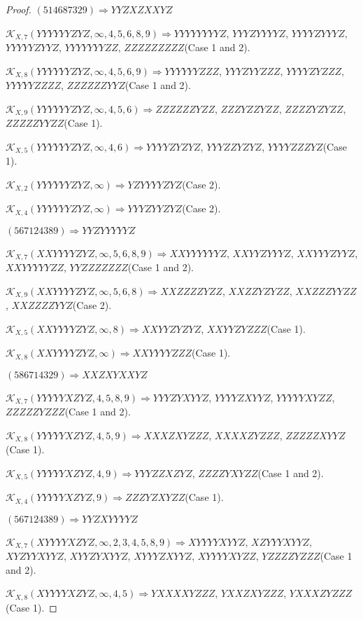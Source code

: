 \documentclass[12pt]{article}
\theoremstyle{plain}
\theoremstyle{definition}
\theoremstyle{remark}
\newcommand{\fancy}[1]{\mathcal{#1}}
\def\K{\fancy{K}}
\begin{document}
\begin{proof}
	$(5 1 4 6 8 7 3 2 9)\Rightarrow YYZXZXXYZ$
	
	
	$\K_{X,7}(YYYYYYZYZ,\infty,4, 5, 6, 8, 9)\Rightarrow $$YYYYYYYYZ$, $YYYZYYYYZ$, $YYYYZYYYZ$, $YYYYYZYYZ$, $YYYYYYYZZ$, $ZZZZZZZZZ$(Case 1 and 2).
	
	$\K_{X,8}(YYYYYYZYZ,\infty,4, 5, 6, 9)\Rightarrow $$YYYYYYZZZ$, $YYYZYYZZZ$, $YYYYZYZZZ$, $YYYYYZZZZ$, $ZZZZZZYYZ$(Case 1 and 2).
	
	$\K_{X,9}(YYYYYYZYZ,\infty,4, 5, 6)\Rightarrow $$ZZZZZZYZZ$, $ZZZYZZYZZ$, $ZZZZYZYZZ$, $ZZZZZYYZZ$(Case 1).
	
	$\K_{X,5}(YYYYYYZYZ,\infty,4, 6)\Rightarrow $$YYYYZYZYZ$, $YYYZZYZYZ$, $YYYYZZZYZ$(Case 1).
	
	$\K_{X,2}(YYYYYYZYZ,\infty)\Rightarrow $$YZYYYYZYZ$(Case 2).
	
	$\K_{X,4}(YYYYYYZYZ,\infty)\Rightarrow $$YYYZYYZYZ$(Case 2).
	
	
	
	$(5 6 7 1 2 4 3 8 9)\Rightarrow YYZYYYYYZ$
	
	
	$\K_{X,7}(XXYYYYZYZ,\infty,5, 6, 8, 9)\Rightarrow $$XXYYYYYYZ$, $XXYYZYYYZ$, $XXYYYZYYZ$, $XXYYYYYZZ$, $YYZZZZZZZ$(Case 1 and 2).
	
	$\K_{X,9}(XXYYYYZYZ,\infty,5, 6, 8)\Rightarrow $$XXZZZZYZZ$, $XXZZYZYZZ$, $XXZZZYYZZ$, $XXZZZZYYZ$(Case 2).
	
	$\K_{X,5}(XXYYYYZYZ,\infty,8)\Rightarrow $$XXYYZYZYZ$, $XXYYZYZZZ$(Case 1).
	
	$\K_{X,8}(XXYYYYZYZ,\infty)\Rightarrow $$XXYYYYZZZ$(Case 1).
	
	
	
	$(5 8 6 7 1 4 3 2 9)\Rightarrow XXZXYXXYZ$
	
	
	$\K_{X,7}(YYYYYXZYZ,4, 5, 8, 9)\Rightarrow $$YYYZYXYYZ$, $YYYYZXYYZ$, $YYYYYXYZZ$, $ZZZZZYZZZ$(Case 1 and 2).
	
	$\K_{X,8}(YYYYYXZYZ,4, 5, 9)\Rightarrow $$XXXZXYZZZ$, $XXXXZYZZZ$, $ZZZZZXYYZ$(Case 1).
	
	$\K_{X,5}(YYYYYXZYZ,4, 9)\Rightarrow $$YYYZZXZYZ$, $ZZZZYXYZZ$(Case 1 and 2).
	
	$\K_{X,4}(YYYYYXZYZ,9)\Rightarrow $$ZZZYZXYZZ$(Case 1).
	
	
	
	$(5 6 7 1 2 4 3 8 9)\Rightarrow YYZXYYYYZ$
	
	
	$\K_{X,7}(XYYYYXZYZ,\infty,2, 3, 4, 5, 8, 9)\Rightarrow $$XYYYYXYYZ$, $XZYYYXYYZ$, $XYZYYXYYZ$, $XYYZYXYYZ$, $XYYYZXYYZ$, $XYYYYXYZZ$, $YZZZZYZZZ$(Case 1 and 2).
	
	$\K_{X,8}(XYYYYXZYZ,\infty,4, 5)\Rightarrow $$YXXXXYZZZ$, $YXXZXYZZZ$, $YXXXZYZZZ$(Case 1).
	

\end{proof}
\end{document}
